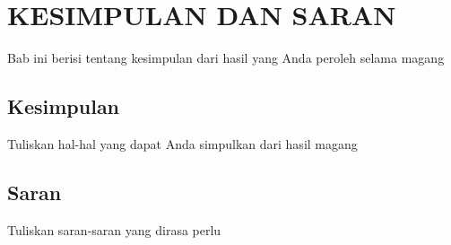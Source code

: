 \chapter{KESIMPULAN DAN SARAN}

Bab ini berisi tentang kesimpulan dari hasil yang Anda peroleh selama magang
\section{Kesimpulan}
Tuliskan hal-hal yang dapat Anda simpulkan dari hasil magang
\section{Saran}
Tuliskan saran-saran yang dirasa perlu
